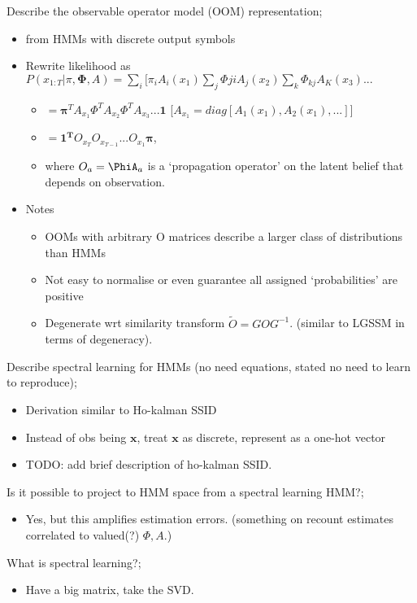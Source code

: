 \documentclass{article}
\begin{document}
Describe the observable operator model (OOM) representation; \begin{itemize} \item from HMMs with discrete output symbols \item Rewrite likelihood as $P(x_{1:T}|\pi, \mathbf{\Phi}, A)=\sum_i[\pi_iA_i(x_1)\sum_j\Phi{ji}A_j(x_2)\sum_k\Phi_{kj}A_K(x_3)...$ \begin{itemize} \item $=\mathbf{\pi}^TA_{x_1}\Phi^TA_{x_2}\Phi^T A_{x_3}...\mathbf{1}$ [$A_{x_1}=diag[A_1(x_1), A_2(x_1),...]]$ \item $=\mathbf{1^T}O_{x_T}O_{x_{T-1}}...O_{x_1}\mathbf{\pi}$, \item where $O_a = \PhiA_a$ is a `propagation operator' on the latent belief that depends on observation. \end{itemize} \item Notes \begin{itemize} \item OOMs with arbitrary O matrices describe a larger class of distributions than HMMs \item Not easy to normalise or even guarantee all assigned `probabilities' are positive \item Degenerate wrt similarity transform $\tilde{O}=GOG^{-1}$. (similar to LGSSM in terms of degeneracy). \end{itemize} \end{itemize}

Describe spectral learning for HMMs (no need equations, stated no need to learn to reproduce); \begin{itemize} \item Derivation similar to Ho-kalman SSID \item Instead of obs being $\mathbf{x}$, treat $\mathbf{x}$ as discrete, represent as a one-hot vector \item TODO: add brief description of ho-kalman SSID. \end{itemize}

Is it possible to project to HMM space from a spectral learning HMM?; \begin{itemize} \item Yes, but this amplifies estimation errors. (something on recount estimates correlated to valued(?) $\Phi, A$.) \end{itemize} 

What is spectral learning?; \begin{itemize} \item Have a big matrix, take the SVD. \end{itemize}
\end{document}
